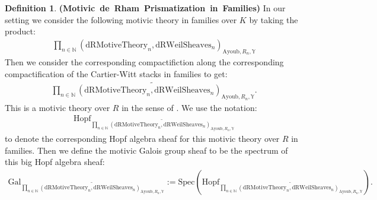 \documentclass[12pt]{article}
\theoremstyle{definition}
\newtheorem{definition}{Definition}
\begin{document}
\begin{definition}  \mbox{\textbf{(Motivic de Rham Prismatization in Families)}}
In our setting we consider the following motivic theory in families over $K$ by taking the product:
\begin{align}
\prod_{n\in \mathbb{N}} (\mathrm{dRMotiveTheory}_{n}, \mathrm{dRWeilSheaves}_n)_{\mathrm{Ayoub}, R_n,\mathbb{Y}}
\end{align}
Then we consider the corresponding compactifiction along the corresponding compactification of the Cartier-Witt stacks in families to get:
\begin{align}
\widetilde{\prod_{n\in \mathbb{N}} (\mathrm{dRMotiveTheory}_{n}, \mathrm{dRWeilSheaves}_n)_{\mathrm{Ayoub}, R_n,\mathbb{Y}}}.
\end{align}
This is a motivic theory over $R$ in the sense of \cite{2A}. We use the notation:
\begin{align}
\mathrm{Hopf}_{\widetilde{\prod_{n\in \mathbb{N}} (\mathrm{dRMotiveTheory}_{n}, \mathrm{dRWeilSheaves}_n)_{\mathrm{Ayoub}, R_n,\mathbb{Y}}}}
\end{align}
to denote the corresponding Hopf algebra sheaf for this motivic theory over $R$ in families. Then we define the motivic Galois group sheaf to be the spectrum of this big Hopf algebra sheaf:
\begin{align}
\mathrm{Gal}_{\widetilde{\prod_{n\in \mathbb{N}} (\mathrm{dRMotiveTheory}_{n}, \mathrm{dRWeilSheaves}_n)_{\mathrm{Ayoub}, R_n,\mathbb{Y}}}}:= \mathrm{Spec}(\mathrm{Hopf}_{\widetilde{\prod_{n\in \mathbb{N}} (\mathrm{dRMotiveTheory}_{n}, \mathrm{dRWeilSheaves}_n)_{\mathrm{Ayoub}, R_n,\mathbb{Y}}}}).
\end{align}
\end{definition}
\end{document}
